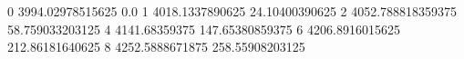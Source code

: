 0 3994.02978515625 0.0
1 4018.1337890625 24.10400390625
2 4052.788818359375 58.759033203125
4 4141.68359375 147.65380859375
6 4206.8916015625 212.86181640625
8 4252.5888671875 258.55908203125
